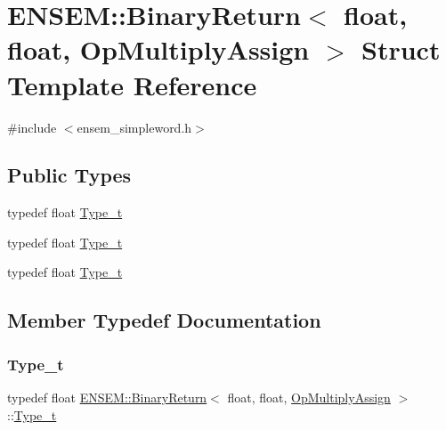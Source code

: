 \hypertarget{structENSEM_1_1BinaryReturn_3_01float_00_01float_00_01OpMultiplyAssign_01_4}{}\section{E\+N\+S\+EM\+:\+:Binary\+Return$<$ float, float, Op\+Multiply\+Assign $>$ Struct Template Reference}
\label{structENSEM_1_1BinaryReturn_3_01float_00_01float_00_01OpMultiplyAssign_01_4}


{\ttfamily \#include $<$ensem\+\_\+simpleword.\+h$>$}

\subsection*{Public Types}
\begin{DoxyCompactItemize}
\item 
typedef float \mbox{\hyperlink{structENSEM_1_1BinaryReturn_3_01float_00_01float_00_01OpMultiplyAssign_01_4_a9d7718a73ef422d2fb14226dbef89f9a}{Type\+\_\+t}}
\item 
typedef float \mbox{\hyperlink{structENSEM_1_1BinaryReturn_3_01float_00_01float_00_01OpMultiplyAssign_01_4_a9d7718a73ef422d2fb14226dbef89f9a}{Type\+\_\+t}}
\item 
typedef float \mbox{\hyperlink{structENSEM_1_1BinaryReturn_3_01float_00_01float_00_01OpMultiplyAssign_01_4_a9d7718a73ef422d2fb14226dbef89f9a}{Type\+\_\+t}}
\end{DoxyCompactItemize}


\subsection{Member Typedef Documentation}
\mbox{\label{structENSEM_1_1BinaryReturn_3_01float_00_01float_00_01OpMultiplyAssign_01_4_a9d7718a73ef422d2fb14226dbef89f9a}} 
\subsubsection{\texorpdfstring{Type\_t}{Type\_t}\hspace{0.1cm}{\footnotesize\ttfamily [1/3]}}
{\footnotesize\ttfamily typedef float \mbox{\hyperlink{structENSEM_1_1BinaryReturn}{E\+N\+S\+E\+M\+::\+Binary\+Return}}$<$ float, float, \mbox{\hyperlink{structENSEM_1_1OpMultiplyAssign}{Op\+Multiply\+Assign}} $>$\+::\mbox{\hyperlink{structENSEM_1_1BinaryReturn_3_01float_00_01float_00_01OpMultiplyAssign_01_4_a9d7718a73ef422d2fb14226dbef89f9a}{Type\+\_\+t}}}

